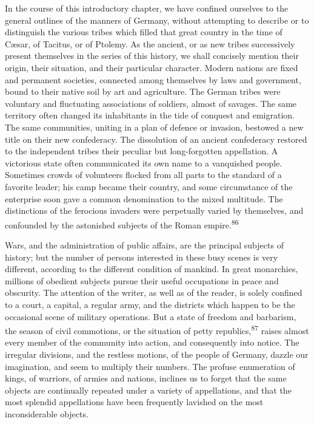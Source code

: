 
In the course of this introductory chapter, we have confined
ourselves to the general outlines of the manners of Germany,
without attempting to describe or to distinguish the various
tribes which filled that great country in the time of Cæsar, of
Tacitus, or of Ptolemy. As the ancient, or as new tribes
successively present themselves in the series of this history, we
shall concisely mention their origin, their situation, and their
particular character. Modern nations are fixed and permanent
societies, connected among themselves by laws and government,
bound to their native soil by art and agriculture. The German
tribes were voluntary and fluctuating associations of soldiers,
almost of savages. The same territory often changed its
inhabitants in the tide of conquest and emigration. The same
communities, uniting in a plan of defence or invasion, bestowed a
new title on their new confederacy. The dissolution of an ancient
confederacy restored to the independent tribes their peculiar but
long-forgotten appellation. A victorious state often communicated
its own name to a vanquished people. Sometimes crowds of
volunteers flocked from all parts to the standard of a favorite
leader; his camp became their country, and some circumstance of
the enterprise soon gave a common denomination to the mixed
multitude. The distinctions of the ferocious invaders were
perpetually varied by themselves, and confounded by the
astonished subjects of the Roman empire.\textsuperscript{86}


Wars, and the administration of public affairs, are the principal
subjects of history; but the number of persons interested in
these busy scenes is very different, according to the different
condition of mankind. In great monarchies, millions of obedient
subjects pursue their useful occupations in peace and obscurity.
The attention of the writer, as well as of the reader, is solely
confined to a court, a capital, a regular army, and the districts
which happen to be the occasional scene of military operations.
But a state of freedom and barbarism, the season of civil
commotions, or the situation of petty republics,\textsuperscript{87} raises almost
every member of the community into action, and consequently into
notice. The irregular divisions, and the restless motions, of the
people of Germany, dazzle our imagination, and seem to multiply
their numbers. The profuse enumeration of kings, of warriors, of
armies and nations, inclines us to forget that the same objects
are continually repeated under a variety of appellations, and
that the most splendid appellations have been frequently lavished
on the most inconsiderable objects.

